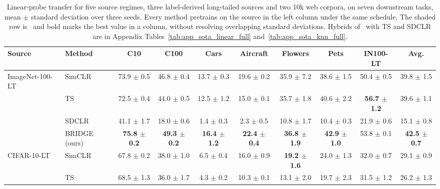 \begin{table}[t]
\centering
\tiny
\setlength{\tabcolsep}{2.6pt}
\renewcommand{\arraystretch}{0.9}
\caption{Linear-probe transfer for five source regimes, three label-derived long-tailed sources and two 10k web corpora, on seven downstream tasks, mean $\pm$ standard deviation over three seeds. Every method pretrains on the source in the left column under the same schedule. The shaded row is \method\ and bold marks the best value in a column, without resolving overlapping standard deviations. Hybrids of \method\ with TS and SDCLR are in Appendix Tables~\ref{tab:app_sota_linear_full} and~\ref{tab:app_sota_knn_full}.}
\label{tab:main_transfer_linear}
\begin{adjustbox}{max width=\textwidth}
\begin{tabular}{l l c c c c c c c c}
\toprule
Source & Method & C10 & C100 & Cars & Aircraft & Flowers & Pets & IN100-LT & Avg. \\
\midrule
ImageNet-100-LT & SimCLR & 73.9 {\scriptsize$\pm$ 0.5} & 46.8 {\scriptsize$\pm$ 0.4} & 13.7 {\scriptsize$\pm$ 0.3} & 19.6 {\scriptsize$\pm$ 0.2} & 35.9 {\scriptsize$\pm$ 7.2} & 38.6 {\scriptsize$\pm$ 1.5} & 50.4 {\scriptsize$\pm$ 0.5} & 39.8 {\scriptsize$\pm$ 1.5} \\
 & TS & 72.5 {\scriptsize$\pm$ 0.4} & 44.0 {\scriptsize$\pm$ 0.5} & 12.5 {\scriptsize$\pm$ 1.2} & 15.0 {\scriptsize$\pm$ 0.1} & 35.7 {\scriptsize$\pm$ 1.8} & 40.6 {\scriptsize$\pm$ 2.2} & \textbf{56.7 {\scriptsize$\pm$ 1.2}} & 39.6 {\scriptsize$\pm$ 1.1} \\
 & SDCLR & 41.1 {\scriptsize$\pm$ 1.7} & 18.0 {\scriptsize$\pm$ 0.6} & 1.4 {\scriptsize$\pm$ 0.3} & 2.3 {\scriptsize$\pm$ 0.5} & 10.8 {\scriptsize$\pm$ 1.7} & 10.4 {\scriptsize$\pm$ 0.3} & 21.9 {\scriptsize$\pm$ 0.6} & 15.1 {\scriptsize$\pm$ 0.8} \\
\rowcolor{blue!10} & BRIDGE (ours) & \textbf{75.8 {\scriptsize$\pm$ 0.2}} & \textbf{49.3 {\scriptsize$\pm$ 0.2}} & \textbf{16.4 {\scriptsize$\pm$ 1.2}} & \textbf{22.4 {\scriptsize$\pm$ 0.4}} & \textbf{36.8 {\scriptsize$\pm$ 1.9}} & \textbf{42.9 {\scriptsize$\pm$ 1.0}} & 53.8 {\scriptsize$\pm$ 0.1} & \textbf{42.5 {\scriptsize$\pm$ 0.7}} \\
\midrule
CIFAR-10-LT & SimCLR & 67.8 {\scriptsize$\pm$ 0.2} & 38.0 {\scriptsize$\pm$ 1.0} & 6.5 {\scriptsize$\pm$ 0.4} & 16.0 {\scriptsize$\pm$ 0.9} & \textbf{19.2 {\scriptsize$\pm$ 1.6}} & 24.0 {\scriptsize$\pm$ 1.3} & 32.0 {\scriptsize$\pm$ 0.7} & 29.1 {\scriptsize$\pm$ 0.9} \\
 & TS & 68.5 {\scriptsize$\pm$ 1.3} & 36.0 {\scriptsize$\pm$ 1.7} & 4.3 {\scriptsize$\pm$ 0.2} & 10.3 {\scriptsize$\pm$ 0.1} & 13.1 {\scriptsize$\pm$ 2.0} & 19.7 {\scriptsize$\pm$ 2.3} & 31.5 {\scriptsize$\pm$ 1.2} & 26.2 {\scriptsize$\pm$ 1.3} \\

\end{tabular}
\end{adjustbox}
\end{table}
